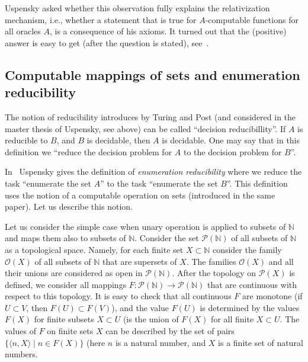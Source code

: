 \documentclass[12pt]{article}
\theoremstyle{remark}
\begin{document}
Uspensky asked whether this observation fully explains the relativization mechanism, i.e., whether a statement that is true for $A$-computable functions for all oracles $A$, is a consequence of his axioms. It turned out that the (positive) answer is easy to get (after the question is stated), see~\cite{Shen1980}.

\subsection*{Computable mappings of sets and enumeration reducibility}

The notion of reducibility introduces by Turing and Post (and considered in the master thesis of Uspensky, see above) can be called ``decision reducibillity''. If $A$ is reducible to $B$, and $B$ is decidable, then $A$ is decidable. One may say that in this definition  we ``reduce the decision problem for $A$ to the decision problem for $B$''. 

In~\cite{1955} Uspensky gives the definition of \emph{enumeration reducibility} where we reduce the task ``enumerate the set $A$'' to the task ``enumerate the set $B$''. This definition uses the notion of a computable operation on sets (introduced in the same paper). Let us describe this notion.

Let us consider the simple case when unary operation is applied to subsets of $\mathbb{N}$ and maps them also to subsets of $\mathbb{N}$. Consider the set $\mathcal{P}(\mathbb{N})$ of all subsets of $\mathbb{N}$ as a topological space. Namely, for each finite set $X\subset \mathbb{N}$ consider the family  $\mathcal{O}(X)$ of all subsets of $\mathbb{N}$ that are supersets of $X$. The families $\mathcal{O}(X)$ and all their unions are considered as open in $\mathcal{P}(\mathbb{N})$. After the topology on $\mathcal{P}(X)$ is defined, we consider all mappings $F\colon \mathcal{P}(\mathbb{N})\to\mathcal{P}(\mathbb{N})$ that are continuous with respect to this topology. It is easy to check that all  continuous $F$ are monotone (if $U\subset V$, then $F(U)\subset F(V)$), and the value $F(U)$ is determined by the values $F(X)$ for finite subsets $X\subset U$ (is the union of $F(X)$ for all finite $X\subset U$. The values of $F$ on finite sets $X$ can be described by the set of pairs $\{\langle n,X\rangle\mid n\in F(X)\}$ (here $n$ is a natural number, and $X$ is a finite set of natural numbers.
\end{document}
